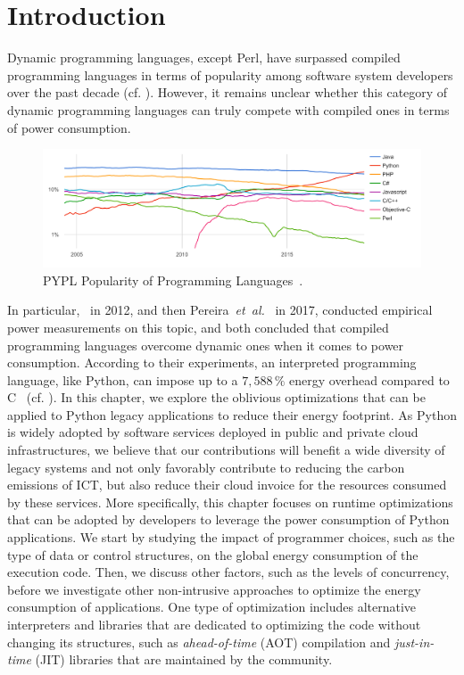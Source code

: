 
\section{Introduction}
Dynamic programming languages, except Perl, have surpassed compiled programming languages in terms of popularity among software system developers over the past decade (cf. ).
However, it remains unclear whether this category of dynamic programming languages can truly compete with compiled ones in terms of power consumption.

\begin{figure}[htbp]
    \includegraphics[width=\linewidth]{imgs/programminglanguangespopularity.png}
    \caption{PYPL Popularity of Programming Languages~\cite{noauthor_pypl_2018}.}
    \label{fig:pypl}
\end{figure}

In particular,\citeauthor{noureddine_preliminary_2012}~\cite{noureddine_preliminary_2012} in 2012, and then Pereira~\emph{et~al.}~\cite{pereira_energy_2017} in 2017, conducted empirical power measurements on this topic, and both concluded that compiled programming languages overcome dynamic ones when it comes to power consumption.
According to their experiments, an interpreted programming language, like Python, can impose up to a $7,588\,\%$ energy overhead compared to C~\cite{pereira_energy_2017} (cf. ).
In this chapter, we explore the oblivious optimizations that can be applied to Python legacy applications to reduce their energy footprint.
As Python is widely adopted by software services deployed in public and private cloud infrastructures, we believe that our contributions will benefit a wide diversity of legacy systems and not only favorably contribute to reducing the carbon emissions of ICT, but also reduce their cloud invoice for the resources consumed by these services.
More specifically, this chapter focuses on runtime optimizations that can be adopted by developers to leverage the power consumption of Python applications.
We start by studying the impact of programmer choices, such as the type of data or control structures, on the global energy consumption of the execution code.
Then, we discuss other factors, such as the levels of concurrency, before we investigate other non-intrusive approaches to optimize the energy consumption of applications.
One type of optimization includes alternative interpreters and libraries that are dedicated to optimizing the code without changing its structures, such as \emph{ahead-of-time} (AOT) compilation and \emph{just-in-time} (JIT) libraries that are maintained by the community.

